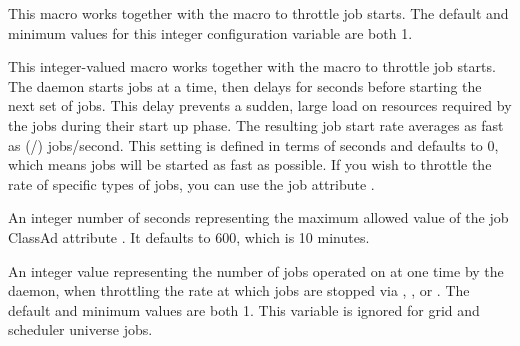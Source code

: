 \begin{description}


  
\label{param:JobStartCount}
\item[\Macro{JOB\_START\_COUNT}]
  This macro works together with the  macro to
  throttle job starts.  The default and minimum values for this
  integer configuration variable are both 1.

\label{param:JobStartDelay}
\item[\Macro{JOB\_START\_DELAY}]
  This integer-valued macro works together with the
   macro
  to throttle job starts.  The   daemon starts
   jobs at a time, then delays for
   seconds before starting the next set of jobs.
  This delay prevents a sudden, large load on resources required by
  the jobs during their start up phase.
  The resulting job start rate
  averages as fast as
  (/) jobs/second.
  This setting is defined in terms of seconds and defaults to 0, which means
  jobs will be started as fast as possible.  If you wish to throttle
  the rate of specific types of jobs, you can use the job attribute
  .

\label{param:MaxNextJobStartDelay}
\item[\Macro{MAX\_NEXT\_JOB\_START\_DELAY}]
  An integer number of seconds representing the maximum allowed value
  of the job ClassAd attribute .  It defaults to 600,
  which is 10 minutes.

\label{param:JobStopCount}
\item[\Macro{JOB\_STOP\_COUNT}]
  An integer value representing the number of jobs operated on at one time
  by the  daemon, when throttling the rate at which jobs
  are stopped via , , or .  
  The default and minimum values are both 1.
  This variable is ignored for grid and scheduler universe jobs.


\end{description}
